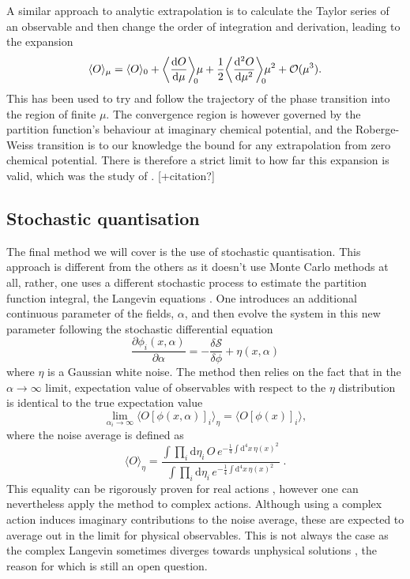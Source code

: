 A similar approach to analytic extrapolation is to calculate the Taylor series
of an observable and then change the order of integration and derivation,
leading to the expansion
%
\begin{equation}
  \langle O \rangle_{\mu} = \langle O \rangle_{0}
   + \bigg\langle \frac{\mathrm{d} O}{\mathrm{d} \mu} \bigg\rangle_{\mathclap{0}} \mu
   + \frac{1}{2} \bigg\langle \frac{\mathrm{d}^2 O}{\mathrm{d} \mu^2} \bigg\rangle_{\mathclap{0}} \mu^2
   + \mathcal{O}(\mu^3).
\end{equation}
%
This has been used to try and follow the trajectory of the phase transition into
the region of finite $\mu$. The convergence region is however governed by the
partition function's behaviour at imaginary chemical potential, and the
Roberge-Weiss transition is to our knowledge the bound for any extrapolation
from zero chemical potential. There is therefore a strict limit to how far this
expansion is valid, which was the study of \citep{Osborn:2008eg}. [+citation?]

\subsection{Stochastic quantisation}

The final method we will cover is the use of stochastic quantisation. This
approach is different from the others as it doesn't use Monte Carlo methods at
all, rather, one uses a different stochastic process to estimate the partition
function integral, the Langevin equations \citep{Parisi:1980ys}. One introduces
an additional continuous parameter of the fields, $\alpha$, and then evolve the
system in this new parameter following the stochastic differential equation
%
\begin{equation}
  \frac{\partial \phi_i (x, \alpha)}{\partial \alpha} = - \frac{\delta
    \mathcal{S}}{\delta \phi} + \eta(x,\alpha)
\end{equation}
%
where $\eta$ is a Gaussian white noise. The method then relies on the fact that
in the $\alpha \to \infty$ limit, expectation value of observables with respect
to the $\eta$ distribution is identical to the true expectation value
%
\begin{equation}
  \lim_{\alpha_i\to\infty} \big\langle O [\phi(x,\alpha)]_i \big\rangle_{\eta}
    = \big\langle O [\phi(x)]_i \big\rangle,
\end{equation}
%
where the noise average is defined as
%
\begin{equation}
  \big\langle O \big\rangle_{\eta} =
  \frac{\int \prod_i \mathrm{d} \eta_i \,O\, e^{-\frac{1}{4}\int \mathrm{d}^4
      x\, \eta(x)^2}}{\int \prod_i \mathrm{d} \eta_i \, e^{-\frac{1}{4}\int
      \mathrm{d}^4 x\, \eta(x)^2}}\;.
\end{equation}
%
This equality can be rigorously proven for real actions
\citep{Damgaard:1987rr,Huffel:2003hf}, however one can nevertheless apply the
method to complex actions. Although using a complex action induces imaginary
contributions to the noise average, these are expected to average out in the
limit for physical observables. This is not always the case as the complex
Langevin sometimes diverges towards unphysical solutions \citep{Ambjorn:1985iw},
the reason for which is still an open question.

